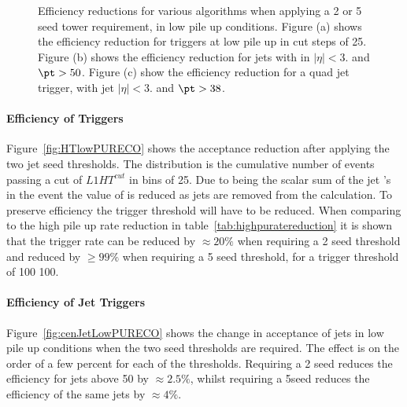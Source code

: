 \begin{figure}[h!]
    \centering
     \newline
    \caption{Efficiency reductions for various \Lone algorithms when applying a 
    2 or \unit{5}{\GeV} seed tower requirement, in low pile up 
    conditions. Figure (a) shows the efficiency reduction for \HT triggers at 
    low pile up in cut steps of \unit{25}{\GeV}. Figure (b) 
    shows the efficiency reduction for jets with in $|\eta| <3.$ and $\pt > 
    50$\GeV. Figure (c) show the efficiency reduction for a quad jet trigger, 
    with jet $|\eta| <3.$ and $\pt > 38$\GeV.}
    \label{fig:lowpuratereductionRECO}
\end{figure}



\paragraph{Efficiency of \HT Triggers} %
\label{par:Efficneicy of HT triggers}
Figure~\ref{fig:HTlowPURECO} shows the acceptance reduction after applying the 
two jet seed thresholds. The distribution is the cumulative number of events 
passing a cut of $L1 HT^{cut}$ in bins of \unit{25}{\GeV}. Due to \HT being the 
scalar sum of the jet \PT's in the event the value of \Lone \HT is reduced as 
jets are removed from the calculation. To preserve efficiency the \Lone trigger 
threshold will have to be reduced. When comparing to the high pile up rate 
reduction in table~\ref{tab:highpuratereduction} it is shown that the trigger 
rate can be reduced by $\approx 20\%$ when requiring a \unit{2}{\GeV} seed 
threshold and reduced by $\geq 99\%$ when requiring a \unit{5}{\GeV} seed 
threshold, for a trigger threshold of 100 \unit{100}{\GeV}.


\paragraph{Efficiency of Jet Triggers} %
\label{par:Efficiency of Jet Triggers}
Figure~\ref{fig:cenJetLowPURECO} shows the change in acceptance of jets in low 
pile up conditions when the two seed thresholds are required. The effect is on 
the order of a few percent for each of the thresholds. Requiring a 
\unit{2}{\GeV} seed reduces the efficiency for jets above \unit{50}{\GeV} by 
$\approx 2.5\%$, whilst requiring a 5\GeV seed reduces the efficiency of the 
same jets by $\approx 4\%$.


